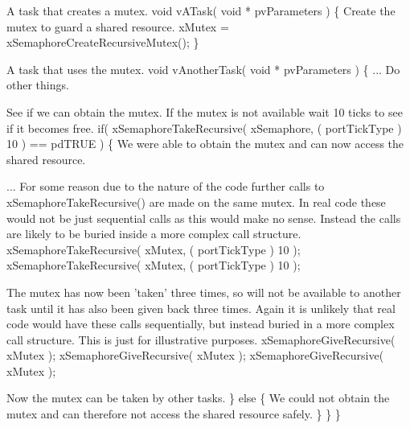 \begin{DoxyPre}A task that creates a mutex.
 void vATask( void * pvParameters )
 \{
Create the mutex to guard a shared resource.
    xMutex = xSemaphoreCreateRecursiveMutex();
 \}\end{DoxyPre}



\begin{DoxyPre}A task that uses the mutex.
 void vAnotherTask( void * pvParameters )
 \{
... Do other things.
\begin{DoxyVerb}if( xMutex != NULL )
{
\end{DoxyVerb}

See if we can obtain the mutex.  If the mutex is not available
wait 10 ticks to see if it becomes free.        
        if( xSemaphoreTakeRecursive( xSemaphore, ( portTickType ) 10 ) == pdTRUE )
        \{
We were able to obtain the mutex and can now access the
shared resource.\end{DoxyPre}



\begin{DoxyPre}...
For some reason due to the nature of the code further calls to 
xSemaphoreTakeRecursive() are made on the same mutex.  In real
code these would not be just sequential calls as this would make
no sense.  Instead the calls are likely to be buried inside
a more complex call structure.
            xSemaphoreTakeRecursive( xMutex, ( portTickType ) 10 );
            xSemaphoreTakeRecursive( xMutex, ( portTickType ) 10 );\end{DoxyPre}



\begin{DoxyPre}The mutex has now been 'taken' three times, so will not be 
available to another task until it has also been given back
three times.  Again it is unlikely that real code would have
these calls sequentially, but instead buried in a more complex
call structure.  This is just for illustrative purposes.
            xSemaphoreGiveRecursive( xMutex );
                        xSemaphoreGiveRecursive( xMutex );
                        xSemaphoreGiveRecursive( xMutex );\end{DoxyPre}



\begin{DoxyPre}Now the mutex can be taken by other tasks.
        \}
        else
        \{
We could not obtain the mutex and can therefore not access
the shared resource safely.
        \}
    \}
 \}
 \end{DoxyPre}
 